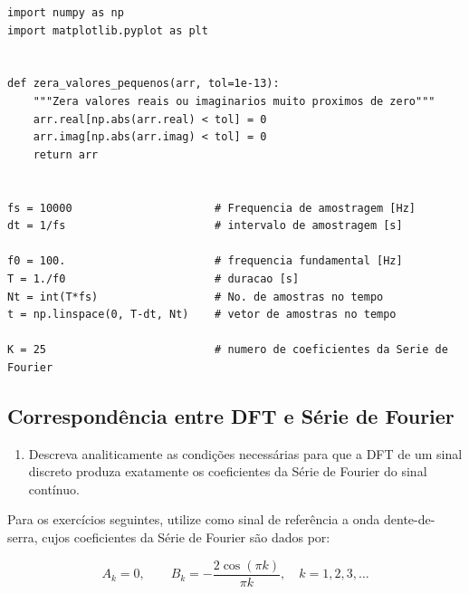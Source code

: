 \documentclass[a4paper,twoside,12pt]{article}
\begin{document}
	\begin{lstlisting}[frame=single, caption={Configurações iniciais comuns aos exercícios.}]
import numpy as np
import matplotlib.pyplot as plt


def zera_valores_pequenos(arr, tol=1e-13):
    """Zera valores reais ou imaginarios muito proximos de zero"""
    arr.real[np.abs(arr.real) < tol] = 0
    arr.imag[np.abs(arr.imag) < tol] = 0
    return arr


fs = 10000                      # Frequencia de amostragem [Hz]
dt = 1/fs                       # intervalo de amostragem [s]

f0 = 100.                       # frequencia fundamental [Hz]
T = 1./f0                       # duracao [s]
Nt = int(T*fs)                  # No. de amostras no tempo
t = np.linspace(0, T-dt, Nt)    # vetor de amostras no tempo

K = 25                          # numero de coeficientes da Serie de Fourier
	\end{lstlisting}
	
	
	\subsection{Correspondência entre DFT e Série de Fourier}
	\label{sec:tarefa_condicoes}
	
		
	\begin{enumerate}
		\item Descreva analiticamente as condições necessárias para que a DFT de um sinal discreto produza exatamente os coeficientes da Série de Fourier do sinal contínuo. 
	\end{enumerate}
	 
	\noindent Para os exercícios seguintes, utilize como sinal de referência a onda dente-de-serra, cujos coeficientes da Série de Fourier são dados por:
	
	\begin{equation}
		A_k = 0, \qquad B_k = -\frac{2 \cos(\pi k)}{\pi k}, \quad k = 1, 2, 3, \ldots
		\label{eq:coef_serra}
	\end{equation}
	
\end{document}
